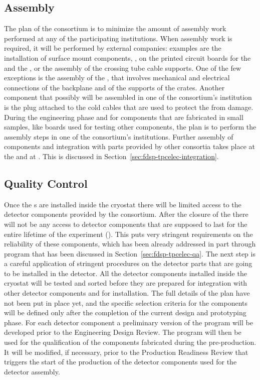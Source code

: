 \subsection{Assembly}
\label{sec:fdsp-tpcelec-production-assembly}

The plan of the  consortium is to minimize
the amount of assembly work performed at any of the participating
institutions. When assembly work is required, it will be performed
by external companies: examples are the installation of surface 
mount components, ,  on the printed 
circuit boards for the  and the , or
the assembly of the crossing tube cable supports. One of the few
exceptions is the assembly of the , that involves
mechanical and electrical connections of the backplane and of
the supports of the crates. Another component that possibly 
will be assembled in one of the consortium's institution is
the plug attached to the cold cables that are used to protect 
the  from  damage. During the engineering
phase and for components that are fabricated in small samples, 
like boards used for testing other components, the plan is to
perform the assembly steps in one of the consortium's institutions.
Further assembly of components and integration with parts
provided by other consortia takes place at the  and
at \surf. This is discussed in 
Section~\ref{sec:fdsp-tpcelec-integration}.

\subsection{Quality Control}
\label{sec:fdsp-tpcelec-production-qc}

Once the s are installed inside the cryostat there will
be limited access to the detector components provided by the 
consortium. After the closure of the  there will not
be any access to detector components that are supposed to
last for the entire lifetime of the experiment (\dunelifetime). This
puts very stringent requirements on the reliability of these
components, which has been already addressed in part through 
 program that has been discussed in
Section~\ref{sec:fdsp-tpcelec-qa}. The next step is
a careful application of stringent  procedures on the 
detector parts that are going to be installed in the detector.
All the detector components installed inside the cryostat will
be tested and sorted before they are prepared for integration
with other detector components and for installation. The full
details of the  plan have not been put in place
yet, and the specific selection criteria for the components will
be defined only after the completion of the current design and
prototyping phase. For each detector component a preliminary
version of the  program will be developed prior
to the Engineering Design Review. The program will then be used for
the qualification of the components fabricated during the 
pre-production. It will be modified, if necessary, prior to the Production
Readiness Review that triggers the start of the production of the
detector components used for the detector assembly.

